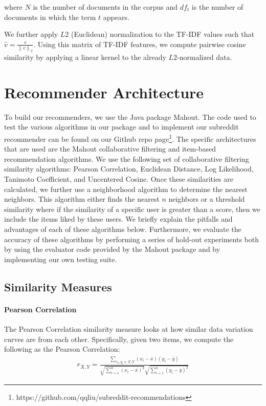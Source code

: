 \documentclass{article}
\begin{document}
where $N$ is the number of documents in the corpus and $df_t$ is the number of documents in which the term $t$ appears.

We further apply $L2$ (Euclidean) normalization to the TF-IDF values such that $\hat{v} = \frac{v}{{\lVert{v}\lVert}_2}$.  Using this matrix of TF-IDF features, we compute pairwise cosine similarity by applying a linear kernel to the already $L2$-normalized data.


\section{Recommender Architecture}\label{sec:rec-arch}

To build our recommenders, we use the Java package Mahout. The code
used to test the various algorithms in our package and to implement
our subreddit recommender can be found on our Github repo page\footnote{https://github.com/qqliu/subreddit-recommendations}. The specific 
architectures that are used are the Mahout collaborative filtering and item-based recommendation algorithms. 
We use the following set of collaborative filtering similarity algorithms: 
Pearson Correlation, Euclidean Distance, Log Likelihood, Tanimoto Coefficient, and Uncentered Cosine. 
Once these similarities are calculated, we further use a neighborhood algorithm to 
determine the nearest neighbors. This algorithm either finds the nearest
$n$ neighbors or a threshold similarity where if the similarity of a specific user is
greater than a score, then we include the items liked by these
users. We briefly explain
the pitfalls and advantages of each of these algorithms below. Furthermore, we evaluate the 
accuracy of these algorithms by performing a series of hold-out experiments both by using the 
evaluator code provided by the Mahout package and by implementing our own testing suite.

\subsection{Similarity Measures}

\paragraph{Pearson Correlation}

The Pearson Correlation similarity measure looks at how similar data variation curves are from each other. 
Specifically, given two items, we compute the following as the Pearson Correlation: \begin{align*}
r_{X, Y} = \frac{\sum_{x_i, y_i \in X, Y} (x_i - \overline{x})(y_i - \overline{y})}{\sqrt{\sum_{i = 1}^n (x_i - \overline{x})^2}\sqrt{\sum_{i=1}^n (y_i - \overline{y})^2}}
\end{align*}
\end{document}
